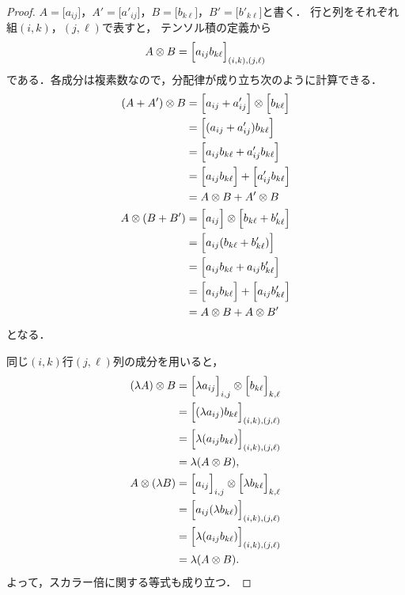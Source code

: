 \begin{proof}
  $A=\Big[a_{ij}\Big]$，$A'=\Big[a'_{ij}\Big]$，$B=\Big[b_{k\ell}\Big]$，$B'=\Big[b'_{k\ell}\Big]$と書く．
  行と列をそれぞれ組$(i,k)$，$(j,\ell)$で表すと，
  テンソル積の定義から
  \[
    A\otimes B=\Bigl[a_{ij}b_{k\ell}\Bigr]_{(i,k),(j,\ell)}
  \]
  である．各成分は複素数なので，分配律が成り立ち次のように計算できる．
  \begin{align*}
    (A+A')\otimes B
     & = \Big[ a_{ij} + a'_{ij} \Big] \otimes \Big[ b_{k\ell} \Big]  \\
     & =\Big[ (a_{ij}+a'_{ij})b_{k\ell} \Big]                        \\
     & = \Big[ a_{ij}b_{k\ell}+a'_{ij}b_{k\ell} \Big]                \\
     & = \Big[ a_{ij}b_{k\ell} \Big] + \Big[ a'_{ij}b_{k\ell} \Big]  \\
     & = A\otimes B + A'\otimes B                                    \\
    A\otimes(B+B')
     & = \Big[ a_{ij} \Big] \otimes \Big[ b_{k\ell}+b'_{k\ell} \Big] \\
     & = \Big[ a_{ij}(b_{k\ell}+b'_{k\ell}) \Big]                    \\
     & = \Bigl[a_{ij}b_{k\ell}+a_{ij}b'_{k\ell}\Bigr]                \\
     & = \Bigl[a_{ij}b_{k\ell}\Bigr]+\Bigl[a_{ij}b'_{k\ell}\Bigr]    \\
     & = A\otimes B+A\otimes B'
  \end{align*}
  となる．

  同じ$(i,k)$行$(j,\ell)$列の成分を用いると，
  \begin{align*}
    (\lambda A)\otimes B
     & =\Bigl[\lambda a_{ij}\Bigr]_{i,j}\otimes\Bigl[b_{k\ell}\Bigr]_{k,\ell} \\
     & =\Bigl[(\lambda a_{ij})b_{k\ell}\Bigr]_{(i,k),(j,\ell)}                \\
     & =\Bigl[\lambda(a_{ij}b_{k\ell})\Bigr]_{(i,k),(j,\ell)}                 \\
     & =\lambda(A\otimes B),                                                  \\
    A\otimes(\lambda B)
     & =\Bigl[a_{ij}\Bigr]_{i,j}\otimes\Bigl[\lambda b_{k\ell}\Bigr]_{k,\ell} \\
     & =\Bigl[a_{ij}(\lambda b_{k\ell})\Bigr]_{(i,k),(j,\ell)}                \\
     & =\Bigl[\lambda(a_{ij}b_{k\ell})\Bigr]_{(i,k),(j,\ell)}                 \\
     & =\lambda(A\otimes B).
  \end{align*}
  よって，スカラー倍に関する等式も成り立つ．


\end{proof}

